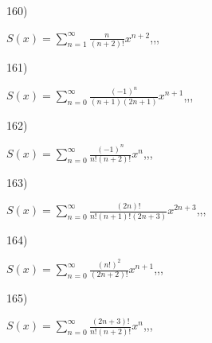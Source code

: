 \documentclass[11pt, ukrainian]{article}
\begin{document}
\par
\vspace{0.9cm}
160) \space 
{%
{$S(x)=\sum\limits_{n=1}^{\infty}{\frac{n}{(n+2)!}}{x^{{n+2}}}$},,, \par \smallskip  
}
\par
\newpage
161) \space 
{%
{$S(x)=\sum\limits_{n=0}^{\infty}{\frac{(-1)^n}{(n+1)(2n+1)}}{x^{{n+1}}}$},,, \par \smallskip  
}
\par
\vspace{0.9cm}
162) \space 
{%
{$S(x)=\sum\limits_{n=0}^{\infty}{\frac{(-1)^n}{n!(n+2)!}}{x^{{n}}}$},,, \par \smallskip  
}
\par
\vspace{0.9cm}
163) \space 
{%
{$S(x)=\sum\limits_{n=0}^{\infty}{\frac{(2n)!}{n!(n+1)!(2n+3)}}{x^{{2n+3}}}$},,, \par \smallskip  
}
\par
\vspace{0.9cm}
164) \space 
{%
{$S(x)=\sum\limits_{n=0}^{\infty}{\frac{(n!)^2}{(2n+2)!}}{x^{{n+1}}}$},,, \par \smallskip  
}
\par
\vspace{0.9cm}
165) \space 
{%
{$S(x)=\sum\limits_{n=0}^{\infty}{\frac{(2n+3)!}{n!(n+2)!}}{x^{n}}$},,, \par \smallskip  
}
\end{document}
